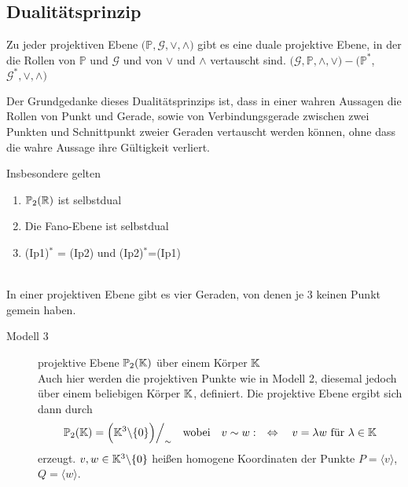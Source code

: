 \subsection*{Dualitätsprinzip}

  Zu jeder projektiven Ebene $\big( \mathbb{P}, \mathcal{G}, \vee, \wedge \big)$ gibt es eine duale projektive Ebene, in 
  der die Rollen von $\mathbb{P}$ und $\mathcal{G}$ und von $\vee$ und $\wedge$ vertauscht sind. 
  $\big( \mathcal{G}, \mathbb{P}, \wedge, \vee \big) - \big( \mathbb{P}^*$, $ \mathcal{G}^*, \vee, \wedge \big)$

  Der Grundgedanke dieses Dualitätsprinzips ist, dass in einer wahren Aussagen die Rollen von Punkt und Gerade, sowie von 
  Verbindungsgerade zwischen zwei Punkten und Schnittpunkt zweier Geraden vertauscht werden können, ohne dass die wahre 
  Aussage ihre Gültigkeit verliert. 

  \begin{bem} Insbesondere gelten 
    \begin{enumerate}
      \item $\mathbb{P}_2(\mathbb R)$ ist selbstdual
      \item Die Fano-Ebene ist selbstdual
      \item (Ip1)$^*$ = (Ip2) und (Ip2)$^*$=(Ip1)
    \end{enumerate}
  \end{bem}

  \begin{thm} \ \\
    In einer projektiven Ebene gibt es vier Geraden, von denen je $3$ keinen Punkt gemein haben.
  \end{thm}

  \begin{description}
      \item[Modell 3] projektive Ebene $\mathbb{P}_2(\mathbb K)$ über einem Körper $\mathbb K$ \\
          Auch hier werden die projektiven Punkte wie in Modell 2, diesemal jedoch über einem beliebigen Körper $\mathbb K$, definiert. 
          Die projektive Ebene ergibt sich dann durch
          \begin{align*}
            \mathbb{P}_2(\mathbb K) = \Big( \mathbb K^3\backslash \{0\}\Big) \Big/_\sim \quad 
            \mbox{wobei} \quad v \sim w : \quad \Leftrightarrow \quad v=\lambda w 
            \mbox{ für } \lambda \in \mathbb K
          \end{align*}
          erzeugt. $v,w \in \mathbb K^3\backslash\{0\}$ heißen homogene Koordinaten der Punkte $P=\langle v \rangle$, $Q=\langle w \rangle$.
  \end{description}

